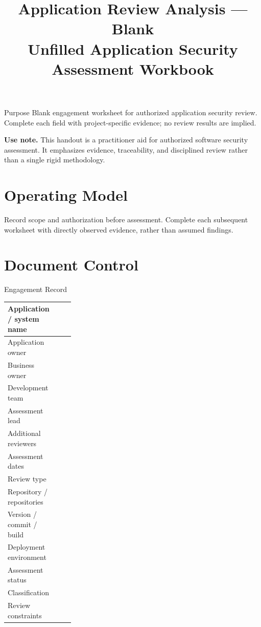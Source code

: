 \documentclass[10pt]{article}
\title{\textbf{Application Review Analysis --- Blank}\\\large Unfilled Application Security Assessment Workbook}
\author{}
\date{}
\begin{document}
\maketitle
\thispagestyle{empty}
\begin{keybox}{Purpose}
Blank engagement worksheet for authorized application security review. Complete each field with project-specific evidence; no review results are implied.
\end{keybox}
\vfill
\noindent\textbf{Use note.} This handout is a practitioner aid for authorized software security assessment. It emphasizes evidence, traceability, and disciplined review rather than a single rigid methodology.
\newpage
\tableofcontents
\newpage

\section{Operating Model}
\noindent Record scope and authorization before assessment. Complete each
subsequent worksheet with directly observed evidence, rather than assumed findings.

\section{Document Control}
\begin{worksheetbox}{Engagement Record}
\par\smallskip\noindent\begin{tabularx}{\linewidth}{@{}L{0.26\linewidth}Y@{}}
Application / system name & \\ \midrule
Application owner & \\ \midrule
Business owner & \\ \midrule
Development team & \\ \midrule
Assessment lead & \\ \midrule
Additional reviewers & \\ \midrule
Assessment dates & \\ \midrule
Review type & \\ \midrule
Repository / repositories & \\ \midrule
Version / commit / build & \\ \midrule
Deployment environment & \\ \midrule
Assessment status & \\ \midrule
Classification & \\ \midrule
Review constraints & \\ 
\end{tabularx}
\end{worksheetbox}
\end{document}
